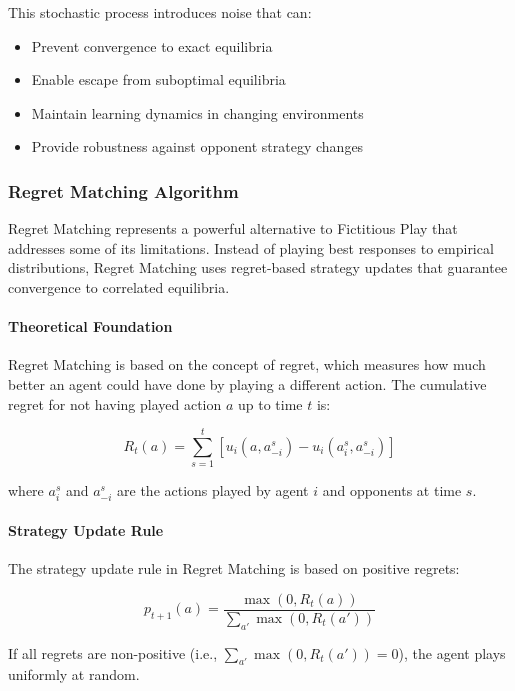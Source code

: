 \documentclass[conference]{IEEEtran}
\begin{document}
This stochastic process introduces noise that can:
\begin{itemize}
    \item Prevent convergence to exact equilibria
    \item Enable escape from suboptimal equilibria
    \item Maintain learning dynamics in changing environments
    \item Provide robustness against opponent strategy changes
\end{itemize}

\subsubsection{Regret Matching Algorithm}

Regret Matching represents a powerful alternative to Fictitious Play that addresses some of its limitations. Instead of playing best responses to empirical distributions, Regret Matching uses regret-based strategy updates that guarantee convergence to correlated equilibria.

\paragraph{Theoretical Foundation}

Regret Matching is based on the concept of regret, which measures how much better an agent could have done by playing a different action. The cumulative regret for not having played action $a$ up to time $t$ is:

\begin{equation}
R_t(a) = \sum_{s=1}^{t} [u_i(a, a_{-i}^s) - u_i(a_i^s, a_{-i}^s)]
\end{equation}

where $a_i^s$ and $a_{-i}^s$ are the actions played by agent $i$ and opponents at time $s$.

\paragraph{Strategy Update Rule}

The strategy update rule in Regret Matching is based on positive regrets:

\begin{equation}
p_{t+1}(a) = \frac{\max(0, R_t(a))}{\sum_{a'} \max(0, R_t(a'))}
\end{equation}

If all regrets are non-positive (i.e., $\sum_{a'} \max(0, R_t(a')) = 0$), the agent plays uniformly at random.
\end{document}
